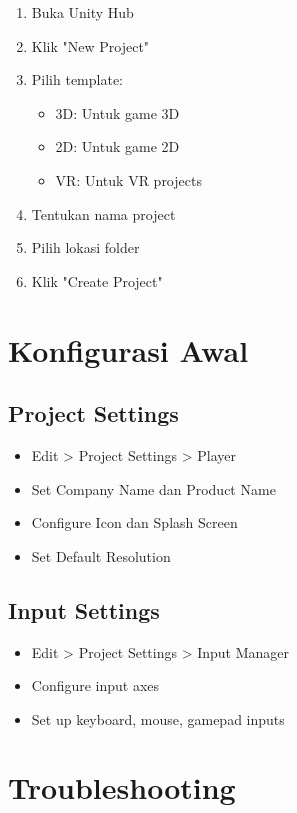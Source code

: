 \begin{enumerate}
\item Buka Unity Hub
\item Klik "New Project"
\item Pilih template:
   \begin{itemize}
   \item 3D: Untuk game 3D
   \item 2D: Untuk game 2D
   \item VR: Untuk VR projects
   \end{itemize}
\item Tentukan nama project
\item Pilih lokasi folder
\item Klik "Create Project"
\end{enumerate}

\section{Konfigurasi Awal}

\subsection{Project Settings}

\begin{itemize}
\item Edit > Project Settings > Player
\item Set Company Name dan Product Name
\item Configure Icon dan Splash Screen
\item Set Default Resolution
\end{itemize}

\subsection{Input Settings}

\begin{itemize}
\item Edit > Project Settings > Input Manager
\item Configure input axes
\item Set up keyboard, mouse, gamepad inputs
\end{itemize}

\section{Troubleshooting}

